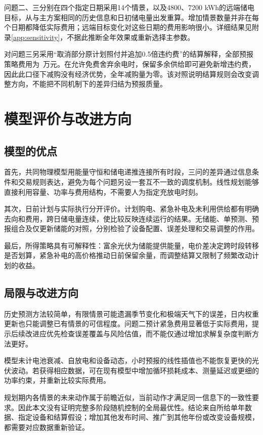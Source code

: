 问题二、三分别在四个指定日期采用14个情景，以及4800、7200 kWh的远端储电目标，从与主方案相同的历史信息和日初储电量出发重算。增加情景数量并非在每个日期都降低实际费用；远端目标变化对这些日期的费用影响很小。详细结果见附录\ref{app:sensitivity}，不据此推断全年效果或重新选择主参数。

对问题三另采用“取消部分原计划照付并追加0.5倍违约费”的结算解释，全部预报策略费用为\QthreeLiteralCost\ 万元。在允许免费舍弃余电时，保留多余供给即可避免新增违约费，因此此口径下减购没有经济优势，全年减购量为零。该对照说明结算规则会改变调整方向，不能把不同机制下的差异归结为预报质量。

\section{模型评价与改进方向}
\subsection{模型的优点}
首先，共同物理模型用能量守恒和储电递推连接所有时段，三问的差异通过信息条件和交易规则表达，避免为每个问题另设一套互不一致的调度机制。线性规划能够直接利用容量、功率与费用结构，不需要人为指定充放电时刻。

其次，日前计划与实际执行分开评价。计划购电、紧急补电及未利用供给都有明确去向和费用，跨日储电量连续，使比较反映连续运行的结果。无储能、单预测、预报组合及仅更新储能的对照，分别检验了设备配置、误差处理和交易调整的作用。

最后，所得策略具有可解释性：富余光伏为储能提供能量，电价差决定跨时段转移是否划算，紧急补电的高价格推动日前保留余量，而调整结算又限制了频繁改动计划的收益。

\subsection{局限与改进方向}
历史预测方法较简单，有限情景可能遗漏季节变化和极端天气下的误差，日内权重更新也只能调整已有情景的可信程度。问题二预计紧急费用显著低于实际费用，提示后续改进应优先检查误差覆盖与风险估值，而不能仅通过增加求解复杂度判断方法更好。

模型未计电池衰减、自放电和设备动态，小时预报的线性插值也不能恢复更快的光伏波动。若获得相应数据，可在现有模型中增加循环损耗成本、测量延迟或更细的功率约束，并重新比较实际费用。

规划期内各情景的未来动作属于前瞻近似，当前动作才满足同一信息下的一致性要求。因此本文没有证明完整多阶段随机控制的全局最优性。结论来自所给单年数据、指定设备和结算假设；增加其他发布时间、推广到其他年份或改变设备规模，都需要对应数据重新验证。

